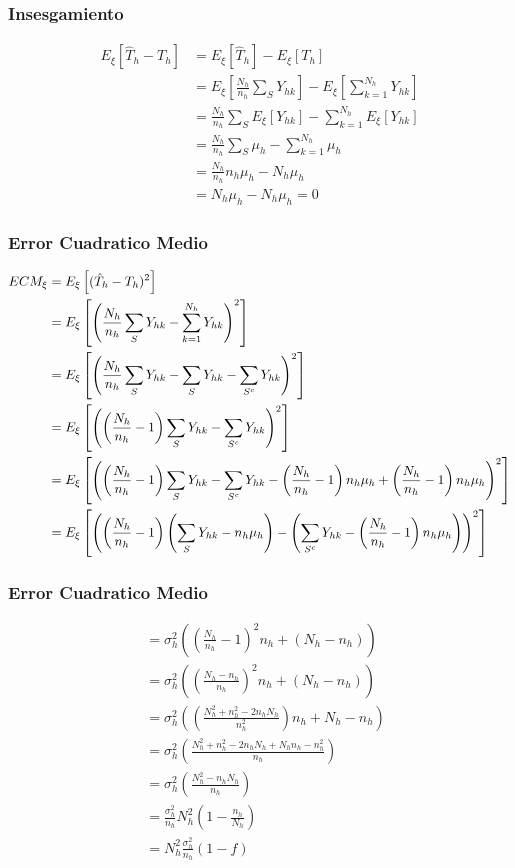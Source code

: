 ﻿\documentclass{beamer}
\begin{document}
\begin{frame}[allowframebreaks*]
\frametitle{Insesgamiento}
\begin{align*}
E_\xi[\hat T_h-T_h]&=E_\xi[\hat T_h]-E_\xi[T_h]\\
&=E_\xi\left[\frac{N_h}{n_h}\sum_SY_{hk}\right]-E_\xi\left[\sum\limits_{k=1}^{N_h}Y_{hk}\right]\\
&=\frac{N_h}{n_h}\sum_SE_\xi\left[Y_{hk}\right]-\sum\limits_{k=1}^{N_h}E_\xi\left[Y_{hk}\right]\\
&=\frac{N_h}{n_h}\sum_S\mu_h-\sum_{k=1}^{N_h}\mu_h\\
&=\frac{N_h}{n_h}n_h\mu_h-N_h\mu_h\\
&=N_h\mu_h-N_h\mu_h=0
\end{align*}
\end{frame}

\begin{frame}[allowframebreaks*]
\frametitle{Error Cuadratico Medio}
{\footnotesize
\begin{align*}
\centering
ECM_\xi&=E_\xi\left[(\hat T_h-T_h)^2\right]\\
&=E_\xi\left[\left(\frac{N_h}{n_h}\sum_SY_{hk}-\sum\limits_{k=1}^{N_h}Y_{hk}\right)^2\right]\\
&=E_\xi\left[\left(\frac{N_h}{n_h}\sum_SY_{hk}-\sum_{S}Y_{hk}-\sum_{S^c}Y_{hk}\right)^2\right]\\
&=E_\xi\left[\left(\left(\frac{N_h}{n_h}-1\right)\sum_SY_{hk}-\sum_{S^c}Y_{hk}\right)^2\right]\\
&=E_\xi\left[\left(\left(\frac{N_h}{n_h}-1\right)\sum_SY_{hk}-\sum_{S^c}Y_{hk}-\left(\frac{N_h}{n_h}-1\right)n_h\mu_h+\left(\frac{N_h}{n_h}-1\right)n_h\mu_h\right)^2\right]\\
&=E_\xi\left[\left(\left(\frac{N_h}{n_h}-1\right)\left(\sum_SY_{hk}-n_h\mu_h\right)-\left(\sum_{S^c}Y_{hk}-\left(\frac{N_h}{n_h}-1\right)n_h\mu_h\right)\right)^2\right]\\
\end{align*}}
\end{frame}

\begin{frame}[allowframebreaks*]
\frametitle{Error Cuadratico Medio}
{\footnotesize
\begin{align*}
&=\sigma^2_h\left(\left(\frac{N_h}{n_h}-1\right)^2n_h+(N_h-n_h)\right)\\
&=\sigma^2_h\left(\left(\frac{N_h-n_h}{n_h}\right)^2n_h+(N_h-n_h)\right)\\
&=\sigma^2_h\left(\left(\frac{N^2_h+n_h^2-2n_hN_h}{n_h^2}\right)n_h+N_h-n_h\right)\\
&=\sigma^2_h\left(\frac{N^2_h+n_h^2-2n_hN_h+N_hn_h-n_h^2}{n_h}\right)\\
&=\sigma^2_h\left(\frac{N^2_h-n_hN_h}{n_h}\right)\\
&=\frac{\sigma^2_h}{n_h}N_h^2\left(1-\frac{n_h}{N_h}\right)\\
&=N_h^2\frac{\sigma^2_h}{n_h}(1-f)
\end{align*}}
\end{frame}
\end{document}
